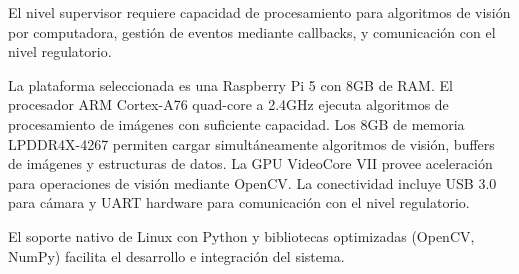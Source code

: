 El nivel supervisor requiere capacidad de procesamiento para algoritmos de visión por computadora, gestión de eventos mediante callbacks, y comunicación con el nivel regulatorio.

La plataforma seleccionada es una Raspberry Pi 5 con 8GB de RAM. El procesador ARM Cortex-A76 quad-core a 2.4GHz ejecuta algoritmos de procesamiento de imágenes con suficiente capacidad. Los 8GB de memoria LPDDR4X-4267 permiten cargar simultáneamente algoritmos de visión, buffers de imágenes y estructuras de datos. La GPU VideoCore VII provee aceleración para operaciones de visión mediante OpenCV. La conectividad incluye USB 3.0 para cámara y UART hardware para comunicación con el nivel regulatorio.

El soporte nativo de Linux con Python y bibliotecas optimizadas (OpenCV, NumPy) facilita el desarrollo e integración del sistema.
